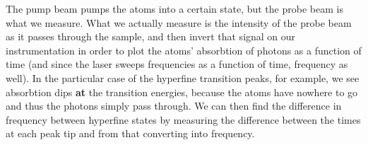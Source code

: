 \documentclass{article}
\begin{document}
  \hspace{.25cm}

  The pump beam pumps the atoms into a certain state, but the probe beam is what we measure.  What we actually measure is the intensity of the probe beam as it passes through the sample, and then invert that signal on our instrumentation in order to plot the atoms' absorbtion of photons as a function of time (and since the laser sweeps frequencies as a function of time, frequency as well).  In the particular case of the hyperfine transition peaks, for example, we see absorbtion dips \textbf{at} the transition energies, because the atoms have nowhere to go and thus the photons simply pass through.  We can then find the difference in frequency between hyperfine states by measuring the difference between the times at each peak tip and from that converting into frequency.
\end{document}
